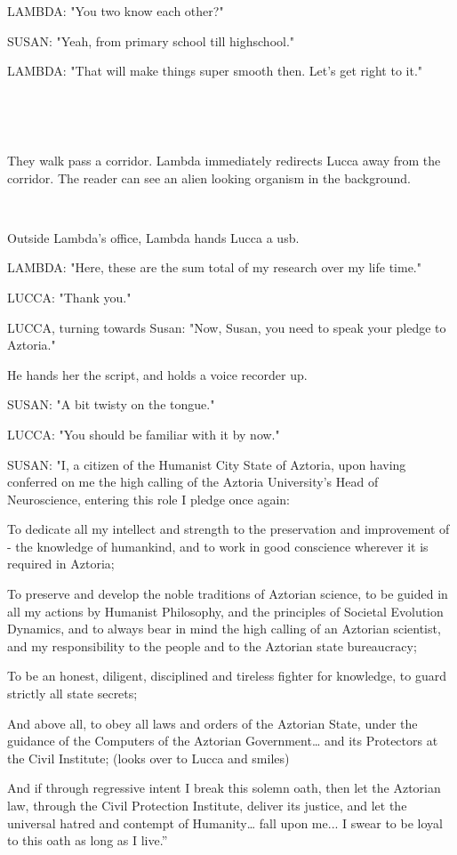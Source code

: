 \documentclass[11pt]{article}
\begin{document}
LAMBDA: "You two know each other?"

SUSAN: "Yeah, from primary school till highschool."

LAMBDA: "That will make things super smooth then. Let's get right to it."

\ 

\ 

They walk pass a corridor.
Lambda immediately redirects Lucca away from the corridor.
The reader can see an alien looking organism in the background.

\ 

Outside Lambda's office, Lambda hands Lucca a usb.

LAMBDA: "Here, these are the sum total of my research over my life time."

LUCCA: "Thank you." 

LUCCA, turning towards Susan: "Now, Susan, you need to speak your pledge to Aztoria."

He hands her the script, and holds a voice recorder up.

SUSAN: "A bit twisty on the tongue."

LUCCA: "You should be familiar with it by now."

SUSAN: "I, a citizen of the Humanist City State of Aztoria, upon having conferred on me the high calling of the Aztoria University’s Head of Neuroscience, entering this role I pledge once again:

To dedicate all my intellect and strength to the preservation and improvement of - the knowledge of humankind, and to work in good conscience wherever it is required in Aztoria;

To preserve and develop the noble traditions of Aztorian science, to be guided in all my actions by Humanist Philosophy, and the principles of  Societal Evolution Dynamics, and to always bear in mind the high calling of an Aztorian scientist, and my responsibility to the people and to the Aztorian state bureaucracy;

To be an honest, diligent, disciplined and tireless fighter for knowledge, to guard strictly all state secrets;

And above all, to obey all laws and orders of the Aztorian State, under the guidance of the Computers of the Aztorian Government… and its Protectors at the Civil Institute; (looks over to Lucca and smiles)

And if through regressive intent I break this solemn oath, then let the Aztorian law, through the Civil Protection Institute, deliver its justice, and let the universal hatred and contempt of Humanity… fall upon me... I swear to be loyal to this oath as long as I live.”
\end{document}
